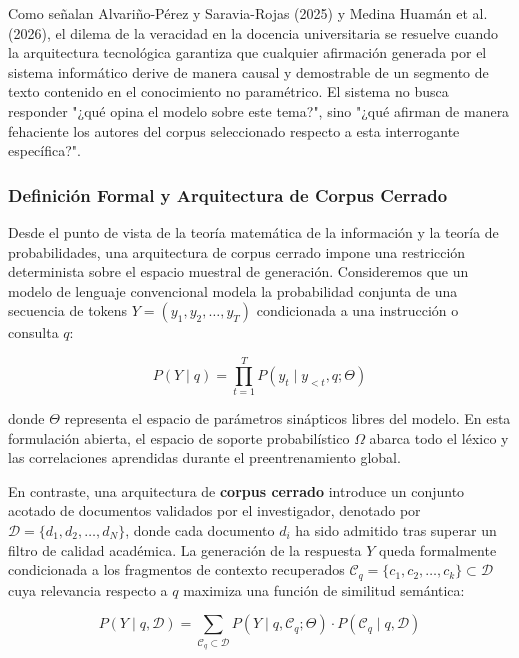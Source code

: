 Como señalan Alvariño-Pérez y Saravia-Rojas (2025) y Medina Huamán et al. (2026), el dilema de la veracidad en la docencia universitaria se resuelve cuando la arquitectura tecnológica garantiza que cualquier afirmación generada por el sistema informático derive de manera causal y demostrable de un segmento de texto contenido en el conocimiento no paramétrico. El sistema no busca responder "¿qué opina el modelo sobre este tema?", sino "¿qué afirman de manera fehaciente los autores del corpus seleccionado respecto a esta interrogante específica?".

\subsubsection{Definición Formal y Arquitectura de Corpus Cerrado}

Desde el punto de vista de la teoría matemática de la información y la teoría de probabilidades, una arquitectura de corpus cerrado impone una restricción determinista sobre el espacio muestral de generación. Consideremos que un modelo de lenguaje convencional modela la probabilidad conjunta de una secuencia de tokens $Y = (y_1, y_2, \dots, y_T)$ condicionada a una instrucción o consulta $q$:

\begin{equation}
P(Y \mid q) = \prod_{t=1}^T P(y_t \mid y_{<t}, q; \Theta)
\end{equation}

donde $\Theta$ representa el espacio de parámetros sinápticos libres del modelo. En esta formulación abierta, el espacio de soporte probabilístico $\Omega$ abarca todo el léxico y las correlaciones aprendidas durante el preentrenamiento global.

En contraste, una arquitectura de \textbf{corpus cerrado} introduce un conjunto acotado de documentos validados por el investigador, denotado por $\mathcal{D} = \{d_1, d_2, \dots, d_N\}$, donde cada documento $d_i$ ha sido admitido tras superar un filtro de calidad académica. La generación de la respuesta $Y$ queda formalmente condicionada a los fragmentos de contexto recuperados $\mathcal{C}_q = \{c_1, c_2, \dots, c_k\} \subset \mathcal{D}$ cuya relevancia respecto a $q$ maximiza una función de similitud semántica:

\begin{equation}
P(Y \mid q, \mathcal{D}) = \sum_{\mathcal{C}_q \subset \mathcal{D}} P(Y \mid q, \mathcal{C}_q; \Theta) \cdot P(\mathcal{C}_q \mid q, \mathcal{D})
\end{equation}

